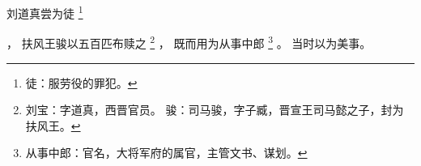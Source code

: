
\switchcolumn*[\section{}]

刘道真尝为徒%
\footnote{%
    徒：服劳役的罪犯。
}%

，
扶风王骏以五百匹布赎之%
\footnote{%
    刘宝：字道真，西晋官员。
    骏：司马骏，字子臧，晋宣王司马懿之子，封为扶风王。
}%
，
既而用为从事中郎%
\footnote{%
    从事中郎：官名，大将军府的属官，主管文书、谋划。
}%
。
当时以为美事。

\switchcolumn



